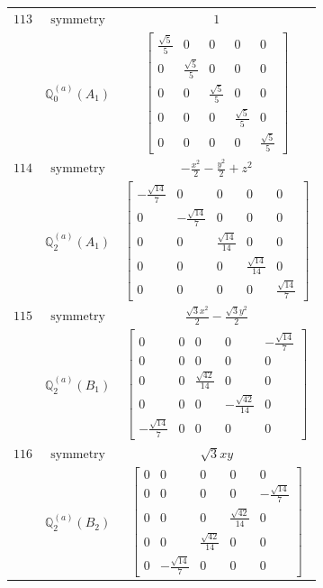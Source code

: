 \documentclass[fleqn,8pt,landscape]{jsarticle}
\begin{document}
\begin{longtable}{ccc}
$ 113 $ & $ \text{symmetry} $ & $ 1 $ \\
$  $ & $ \mathbb{Q}_{0}^{(a)}(A_{1}) $ & $ \begin{bmatrix} \frac{\sqrt{5}}{5} & 0 & 0 & 0 & 0 \\ 0 & \frac{\sqrt{5}}{5} & 0 & 0 & 0 \\ 0 & 0 & \frac{\sqrt{5}}{5} & 0 & 0 \\ 0 & 0 & 0 & \frac{\sqrt{5}}{5} & 0 \\ 0 & 0 & 0 & 0 & \frac{\sqrt{5}}{5} \end{bmatrix} $ \\ \hline
$ 114 $ & $ \text{symmetry} $ & $ - \frac{x^{2}}{2} - \frac{y^{2}}{2} + z^{2} $ \\
$  $ & $ \mathbb{Q}_{2}^{(a)}(A_{1}) $ & $ \begin{bmatrix} - \frac{\sqrt{14}}{7} & 0 & 0 & 0 & 0 \\ 0 & - \frac{\sqrt{14}}{7} & 0 & 0 & 0 \\ 0 & 0 & \frac{\sqrt{14}}{14} & 0 & 0 \\ 0 & 0 & 0 & \frac{\sqrt{14}}{14} & 0 \\ 0 & 0 & 0 & 0 & \frac{\sqrt{14}}{7} \end{bmatrix} $ \\ \hline
$ 115 $ & $ \text{symmetry} $ & $ \frac{\sqrt{3} x^{2}}{2} - \frac{\sqrt{3} y^{2}}{2} $ \\
$  $ & $ \mathbb{Q}_{2}^{(a)}(B_{1}) $ & $ \begin{bmatrix} 0 & 0 & 0 & 0 & - \frac{\sqrt{14}}{7} \\ 0 & 0 & 0 & 0 & 0 \\ 0 & 0 & \frac{\sqrt{42}}{14} & 0 & 0 \\ 0 & 0 & 0 & - \frac{\sqrt{42}}{14} & 0 \\ - \frac{\sqrt{14}}{7} & 0 & 0 & 0 & 0 \end{bmatrix} $ \\ \hline
$ 116 $ & $ \text{symmetry} $ & $ \sqrt{3} x y $ \\
$  $ & $ \mathbb{Q}_{2}^{(a)}(B_{2}) $ & $ \begin{bmatrix} 0 & 0 & 0 & 0 & 0 \\ 0 & 0 & 0 & 0 & - \frac{\sqrt{14}}{7} \\ 0 & 0 & 0 & \frac{\sqrt{42}}{14} & 0 \\ 0 & 0 & \frac{\sqrt{42}}{14} & 0 & 0 \\ 0 & - \frac{\sqrt{14}}{7} & 0 & 0 & 0 \end{bmatrix} $ \\ \hline

\end{longtable}
\end{document}
